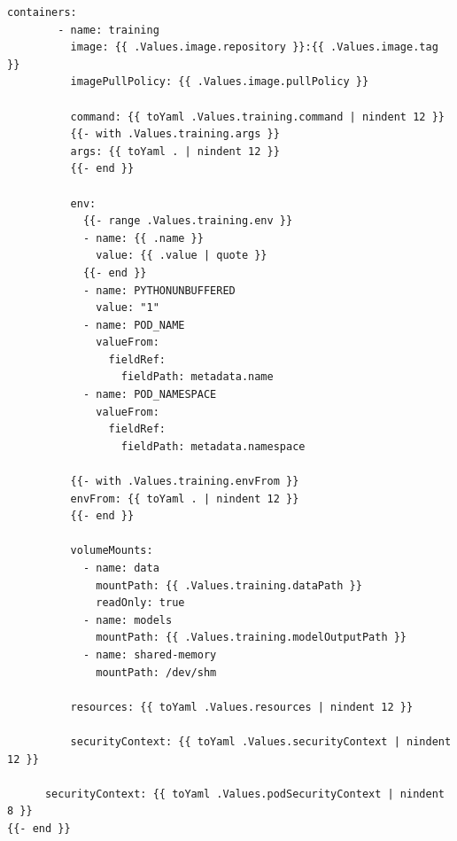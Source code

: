 \begin{lstlisting}[style=yaml, caption=Helm Template for Training Job]
      containers:
        - name: training
          image: {{ .Values.image.repository }}:{{ .Values.image.tag }}
          imagePullPolicy: {{ .Values.image.pullPolicy }}

          command: {{ toYaml .Values.training.command | nindent 12 }}
          {{- with .Values.training.args }}
          args: {{ toYaml . | nindent 12 }}
          {{- end }}

          env:
            {{- range .Values.training.env }}
            - name: {{ .name }}
              value: {{ .value | quote }}
            {{- end }}
            - name: PYTHONUNBUFFERED
              value: "1"
            - name: POD_NAME
              valueFrom:
                fieldRef:
                  fieldPath: metadata.name
            - name: POD_NAMESPACE
              valueFrom:
                fieldRef:
                  fieldPath: metadata.namespace

          {{- with .Values.training.envFrom }}
          envFrom: {{ toYaml . | nindent 12 }}
          {{- end }}

          volumeMounts:
            - name: data
              mountPath: {{ .Values.training.dataPath }}
              readOnly: true
            - name: models
              mountPath: {{ .Values.training.modelOutputPath }}
            - name: shared-memory
              mountPath: /dev/shm

          resources: {{ toYaml .Values.resources | nindent 12 }}

          securityContext: {{ toYaml .Values.securityContext | nindent 12 }}

      securityContext: {{ toYaml .Values.podSecurityContext | nindent 8 }}
{{- end }}
\end{lstlisting}


